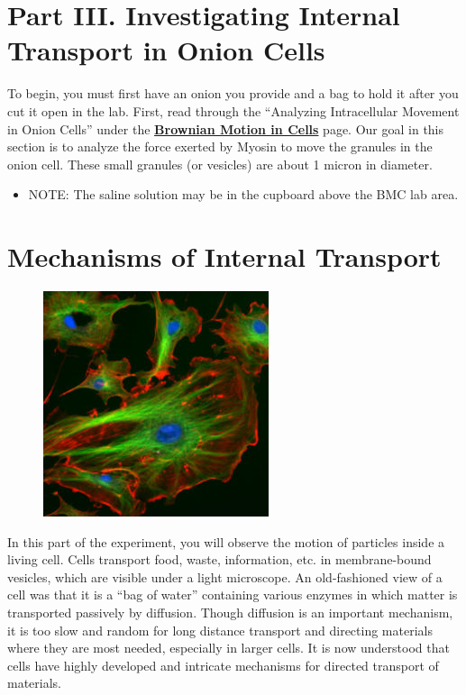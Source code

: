 \documentclass{../lab}
\begin{document}
\section{Part III. Investigating Internal Transport in Onion Cells}

To begin, you must first have an onion you provide and a bag to hold it after you cut it open in the lab. First, read through the ``Analyzing Intracellular Movement in Onion Cells'' under the \href{http://dev-physicsadv.pantheon.berkeley.edu/BMC}{\textbf{Brownian Motion in Cells}} page. Our goal in this section is to analyze the force exerted by Myosin to move the granules in the onion cell. These small granules (or vesicles) are about 1 micron in diameter.

\begin{itemize}
    \item NOTE: The saline solution may be in the cupboard above the BMC lab area.

\end{itemize}

\section{Mechanisms of Internal Transport}


\begin{figure}[h]
    \centering
    \href{http://experimentationlab.berkeley.edu/sites/default/files/images/250px-BMC_Cytoskeleton.jpg}{\includegraphics[width=0.5\linewidth]{images/250px-BMC_Cytoskeleton.jpg}}
    \caption{}
    \label{fig:250px-BMC_Cytoskeleton}
\end{figure}

In this part of the experiment, you will observe the motion of particles inside a living cell. Cells transport food, waste, information, etc. in membrane-bound vesicles, which are visible under a light microscope. An old-fashioned view of a cell was that it is a ``bag of water'' containing various enzymes in which matter is transported passively by diffusion. Though diffusion is an important mechanism, it is too slow and random for long distance transport and directing materials where they are most needed, especially in larger cells. It is now understood that cells have highly developed and intricate mechanisms for directed transport of materials.
\end{document}
